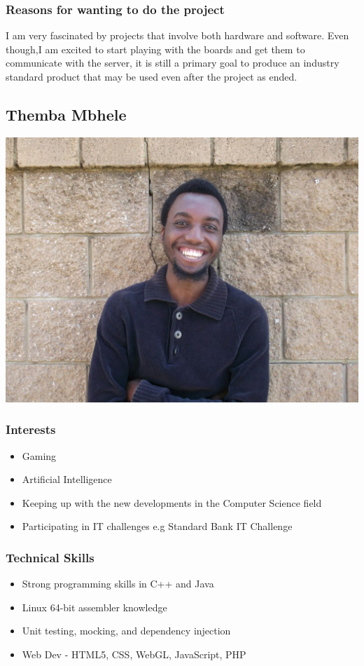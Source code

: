 \documentclass[a4paper,12pt]{article}
\begin{document}
\subsubsection{Reasons for wanting to do the project}
I am very fascinated by projects that involve both hardware and software. Even though,I am excited to start playing with the boards and get them to communicate with the server, it is still a primary goal to produce an industry standard product that may be used even after the project as ended.
\newpage
\subsection{Themba Mbhele}
\includegraphics[width=\textwidth]{images/Themba}
\subsubsection{Interests}
\begin{itemize}
    \item Gaming
    \item Artificial Intelligence
    \item Keeping up with the new developments in the Computer Science field
    \item Participating in IT challenges e.g Standard Bank IT Challenge
\end{itemize}
\subsubsection{Technical Skills}
\begin{itemize}
    \item Strong programming skills in C++ and Java
    \item Linux 64-bit assembler knowledge
    \item Unit testing, mocking, and dependency injection
    \item Web Dev - HTML5, CSS, WebGL, JavaScript, PHP
\end{itemize}
\end{document}
